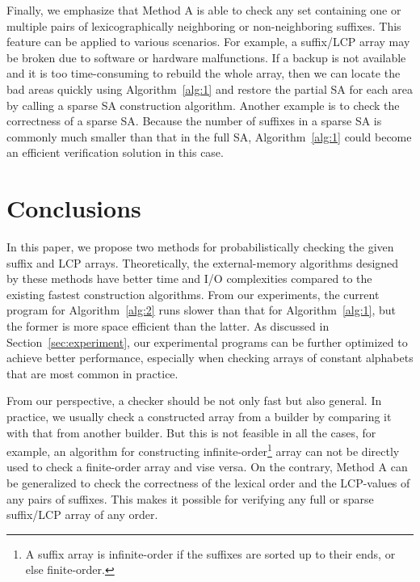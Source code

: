 \documentclass[10pt,journal,compsoc]{IEEEtran}
\begin{document}
Finally, we emphasize that Method A is able to check any set containing one or multiple pairs of lexicographically neighboring or non-neighboring suffixes. This feature can be applied to various scenarios. For example, a suffix/LCP array may be broken due to software or hardware malfunctions. If a backup is not available and it is too time-consuming to rebuild the whole array, then we can locate the bad areas quickly using Algorithm~\ref{alg:1} and restore the partial SA for each area by calling a sparse SA construction algorithm. Another example is to check the correctness of a sparse SA. Because the number of suffixes in a sparse SA is commonly much smaller than that in the full SA, Algorithm~\ref{alg:1} could become an efficient verification solution in this case.

\section{Conclusions} \label{sec:conclusion}

In this paper, we propose two methods for probabilistically checking the given suffix and LCP arrays. Theoretically, the external-memory algorithms designed by these methods have better time and I/O complexities compared to the existing fastest construction algorithms. From our experiments, the current program for Algorithm~\ref{alg:2} runs slower than that for Algorithm~\ref{alg:1}, but the former is more space efficient than the latter. As discussed in Section~\ref{sec:experiment}, our experimental programs can be further optimized to achieve better performance, especially when checking arrays of constant alphabets that are most common in practice. 

From our perspective, a checker should be not only fast but also general. In practice, we usually check a constructed array from a builder by comparing it with that from another builder. But this is not feasible in all the cases, for example, an algorithm for constructing infinite-order\footnote{A suffix array is infinite-order if the suffixes are sorted up to their ends, or else finite-order.} array can not be directly used to check a finite-order array and vise versa. On the contrary, Method A can be generalized to check the correctness of the lexical order and the LCP-values of any pairs of suffixes. This makes it possible for verifying any full or sparse suffix/LCP array of any order.
\end{document}
